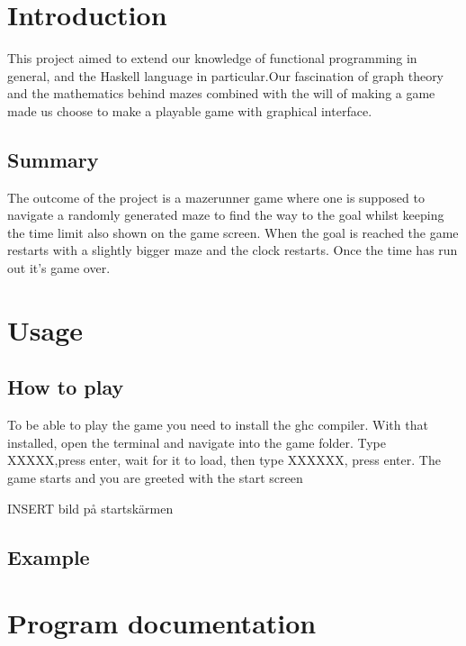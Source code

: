 \documentclass[12pt, a4paper]{article}
\begin{document}
\maketitle

\newpage


\tableofcontents


\newpage
\section{Introduction}
This project aimed to extend our knowledge of functional programming in general, and the Haskell language in particular.Our fascination of graph theory and the mathematics behind mazes combined with the will of making a game made us choose to make a playable game with graphical interface.

\subsection{Summary}
The outcome of the project is a mazerunner game where one is supposed to navigate a randomly generated maze to find the way to the goal whilst keeping the time limit also shown on the game screen. When the goal is reached the game restarts with a slightly bigger maze and the clock restarts. Once the time has run out it's game over.


\section{Usage}
\subsection{How to play}
To be able to play the game you need to install the ghc compiler. With that installed, open the terminal and navigate into the game folder. Type XXXXX,press enter, wait for it to load, then type XXXXXX, press enter. The game starts and you are greeted with the start screen

INSERT bild på startskärmen

\subsection{Example}


\newpage
\section{Program documentation}
\end{document}

